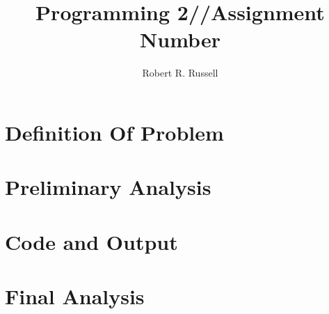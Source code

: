 \documentclass[letterpaper,oneside]{scrartcl}
\title{Programming 2//Assignment Number}
\author{Robert R. Russell}
\begin{document}
\maketitle

\section{Definition Of Problem}

\section{Preliminary Analysis}

\section{Code and Output}

\section{Final Analysis}
\end{document}
